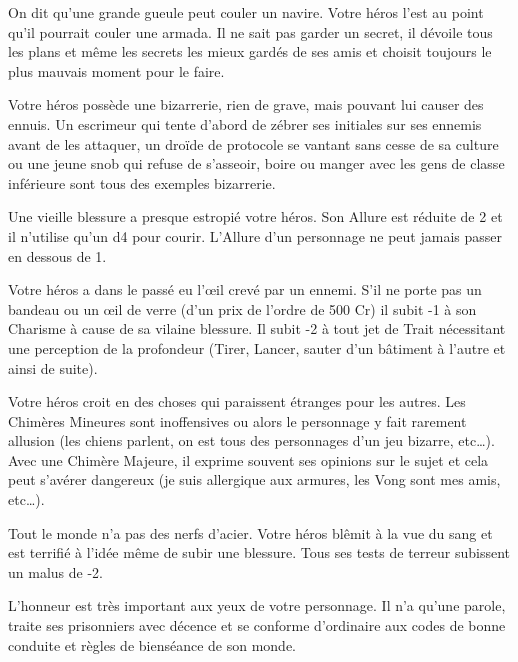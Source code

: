 \begin{description}[align=left]
    \item [Bavard (Mineur)]
        On dit qu’une grande gueule peut couler un navire. Votre héros l’est au point qu’il pourrait couler une armada. Il ne sait pas garder un secret, il dévoile tous les plans et même les secrets les mieux gardés de ses amis et choisit toujours le plus mauvais moment pour le faire.

    \item [Bizarrerie (Mineur)]
        Votre héros possède une bizarrerie, rien de grave, mais pouvant lui causer des ennuis. Un escrimeur qui tente d’abord de zébrer ses initiales sur ses ennemis avant de les attaquer, un droïde de protocole se vantant sans cesse de sa culture ou une jeune snob qui refuse de s’asseoir, boire ou manger avec les gens de classe inférieure sont tous des exemples bizarrerie.

    \item [Boiteux (Majeur)]
        Une vieille blessure a presque estropié votre héros. Son Allure est réduite de 2 et il n’utilise qu’un d4 pour courir. L’Allure d’un personnage ne peut jamais passer en dessous de 1.

    \item [Borgne (Majeur)]
        Votre héros a dans le passé eu l’\oe{il} crevé par un ennemi. S’il ne porte pas un bandeau ou un \oe{il} de verre (d’un prix de l’ordre de 500 Cr) il subit -1 à son Charisme à cause de sa vilaine blessure. Il subit -2 à tout jet de Trait nécessitant une perception de la profondeur (Tirer, Lancer, sauter d’un bâtiment à l’autre et ainsi de suite).

    \item [Chimères (Mineur ou Majeur)]
        Votre héros croit en des choses qui paraissent étranges pour les autres. Les Chimères Mineures sont inoffensives ou alors le personnage y fait rarement allusion (les chiens parlent, on est tous des personnages d’un jeu bizarre, etc\ldots).\\
        Avec une Chimère Majeure, il exprime souvent ses opinions sur le sujet et cela peut s’avérer dangereux (je suis allergique aux armures, les Vong sont mes amis, etc\ldots).

    \item [Couard (Majeur)]
        Tout le monde n’a pas des nerfs d’acier. Votre héros blêmit à la vue du sang et est terrifié à l’idée même de subir une blessure. Tous ses tests de terreur subissent un malus de -2.

    \item [Code d’Honneur (Majeur)]
        L’honneur est très important aux yeux de votre personnage. Il n’a qu’une parole, traite ses prisonniers avec décence et se conforme d’ordinaire aux codes de bonne conduite et règles de bienséance de son monde.


\end{description}
